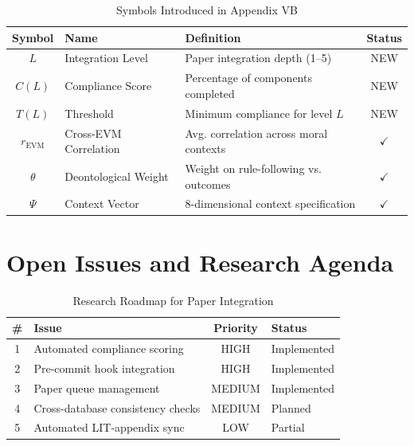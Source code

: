 \begin{table}[htbp]
\centering
\caption{Symbols Introduced in Appendix VB}
\label{tab:paperint-symbols}
\renewcommand{\arraystretch}{1.3}
\begin{tabular}{@{}clp{6cm}c@{}}
\toprule
\textbf{Symbol} & \textbf{Name} & \textbf{Definition} & \textbf{Status} \\
\midrule
$L$ & Integration Level & Paper integration depth (1--5) & NEW \\
$C(L)$ & Compliance Score & Percentage of components completed & NEW \\
$T(L)$ & Threshold & Minimum compliance for level $L$ & NEW \\
$r_{\text{EVM}}$ & Cross-EVM Correlation & Avg. correlation across moral contexts & $\checkmark$ \\
$\theta$ & Deontological Weight & Weight on rule-following vs. outcomes & $\checkmark$ \\
$\Psi$ & Context Vector & 8-dimensional context specification & $\checkmark$ \\
\bottomrule
\end{tabular}
\end{table}


\section{Open Issues and Research Agenda}
\label{sec:paperint-open}

\begin{table}[htbp]
\centering
\caption{Research Roadmap for Paper Integration}
\label{tab:paperint-roadmap}
\renewcommand{\arraystretch}{1.3}
\begin{tabular}{@{}clcl@{}}
\toprule
\textbf{\#} & \textbf{Issue} & \textbf{Priority} & \textbf{Status} \\
\midrule
1 & Automated compliance scoring & HIGH & Implemented \\
2 & Pre-commit hook integration & HIGH & Implemented \\
3 & Paper queue management & MEDIUM & Implemented \\
4 & Cross-database consistency checks & MEDIUM & Planned \\
5 & Automated LIT-appendix sync & LOW & Partial \\
\bottomrule
\end{tabular}
\end{table}


